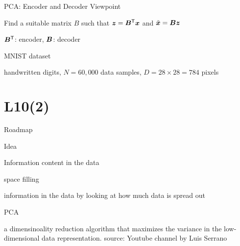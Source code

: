 \documentclass[handout,fleqn,aspectratio=169]{beamer}
\begin{document}
\begin{frame}{PCA: Encoder and Decoder Viewpoint}

\vspace{-0.7cm}
\plitemsep 0.07in
\bci 
\item Find a suitable matrix $B$ such that $\bm{z} = {\bm{B}}^{\mathsf{T}}\bm{x}$ and $\tilde{\bm{x}} = \bm{B} \bm{z}$
\item ${\bm{B}}^{\mathsf{T}}$: encoder, $\bm{B}$: decoder

\item \exam MNIST dataset
\bci
\item handwritten digits, $N=60,000$ data samples, $D=28\times28 = 784$ pixels
\eci
{}

\eci


\end{frame}


\section{L10(2)}
\begin{frame}{Roadmap}

\plitemsep 0.1in

\bce[(1)] 

\item {}
\item {} 
\item {}

\ece
\end{frame}

\begin{frame}{Idea}

\plitemsep 0.1in

\bci 

\item Information content in the data

\bci
\item space filling
\item information in the data by looking at how much data is spread out
\eci

\item PCA
\bci
\item a dimensinoality reduction algorithm that maximizes the variance in the low-dimensional data representation.
\eci
\eci
\vspace{-0.4cm}
\vspace{-0.5cm}
\raggedleft
{\scriptsize source: Youtube channel by Luis Serrano}
\end{frame}
\end{document}
